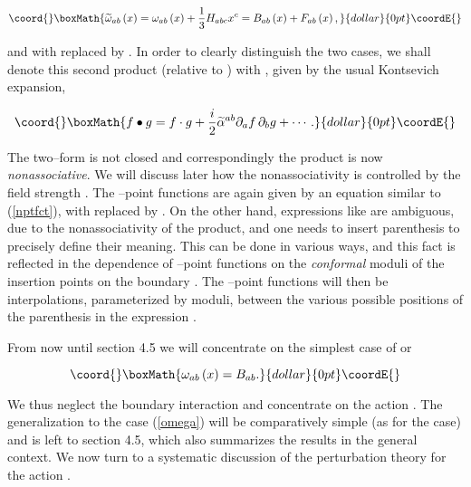 \documentclass[a4paper,11pt]{article}
\begin{document}
$$\coord{}\boxMath{
\widetilde{\omega}_{ab}\left( x\right) = \omega_{ab}\left( x\right) + 
\frac{1}{3}H_{abc}x^{c} = B_{ab}\left( x\right) + F_{ab}\left( 
x\right) ,
}{dollar}{0pt}\coordE{}$$

\noindent
and with \myHighlight{$\alpha$}\coordHE{} replaced by \coordHE{}.  In order to clearly distinguish the two cases,
we shall denote this second product (relative to \myHighlight{$\widetilde{\alpha}$}\coordHE{}) with
\myHighlight{$\bullet$}\coordHE{}, given by the usual Kontsevich expansion,

$$\coord{}\boxMath{
f \bullet g = f\cdot g + \frac{i}{2}\widetilde{\alpha}^{ab}\partial_{a}f
\,\partial_{b}g + \cdots .
}{dollar}{0pt}\coordE{}$$

\noindent
The two--form \myHighlight{$\widetilde{\omega}$}\coordHE{} is not closed and correspondingly the
product \myHighlight{$\bullet $}\coordHE{} is now \textit{nonassociative}. We will discuss later
how the nonassociativity is controlled by the field strength \coordHE{}. The \coordHE{}--point functions are again given by an
equation similar to (\ref{nptfct}), with \myHighlight{$\star$}\coordHE{} replaced by \myHighlight{$\bullet$}\coordHE{}. On
the other hand, expressions like \coordHE{} are
ambiguous, due to the nonassociativity of the product, and one needs to
insert parenthesis to precisely define their meaning. This can be done in
various ways, and this fact is reflected in the dependence of \coordHE{}--point
functions on the \coordHE{} \textit{conformal} moduli of the insertion points on
the boundary \myHighlight{$\partial \Sigma$}\coordHE{}. The \coordHE{}--point functions will then be
interpolations, parameterized by \coordHE{} moduli, between the various possible
positions of the parenthesis in the expression \coordHE{}.

From now until section 4.5 we will concentrate on the simplest case of 
\coordHE{} or

$$\coord{}\boxMath{
\omega _{ab}\left( x\right) =B_{ab}.
}{dollar}{0pt}\coordE{}$$

\noindent
We thus neglect the boundary interaction \coordHE{} and concentrate on the
action \coordHE{}. The generalization to the case (\ref{omega}) will be
comparatively simple (as for the \coordHE{} case)
and is left to section 4.5, which also summarizes
the results in the general context. We now turn to a systematic discussion
of the perturbation theory for the action \coordHE{}.
\end{document}
